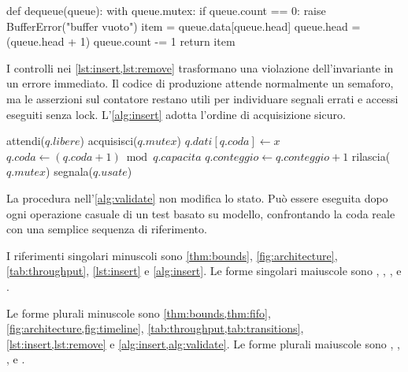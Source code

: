 \documentclass[italian]{../../unipd-notes}
\begin{document}
\begin{unipdcode}[language=Python,caption={Rimozione con controllo esplicito},label={lst:remove}]
def dequeue(queue):
    with queue.mutex:
        if queue.count == 0:
            raise BufferError("buffer vuoto")
        item = queue.data[queue.head]
        queue.head = (queue.head + 1) %
        queue.count -= 1
        return item
\end{unipdcode}

I controlli nei \cref{lst:insert,lst:remove} trasformano una violazione dell'invariante in un errore immediato. Il codice di produzione attende normalmente un semaforo, ma le asserzioni sul contatore restano utili per individuare segnali errati e accessi eseguiti senza lock. L'\cref{alg:insert} adotta l'ordine di acquisizione sicuro.

\begin{algorithm}[H]
  \caption{Inserimento bloccante}\label{alg:insert}
  attendi($q.libere$)\;
  acquisisci($q.mutex$)\;
  $q.dati[q.coda]\gets x$\;
  $q.coda\gets(q.coda+1)\bmod q.capacita$\;
  $q.conteggio\gets q.conteggio+1$\;
  rilascia($q.mutex$)\;
  segnala($q.usate$)\;
  \;
\end{algorithm}

La procedura nell'\cref{alg:validate} non modifica lo stato. Può essere eseguita dopo ogni operazione casuale di un test basato su modello, confrontando la coda reale con una semplice sequenza di riferimento.

\begin{algorithm}[H]
  \caption{Validazione dello stato della coda}\label{alg:validate}
  \;
\end{algorithm}

I riferimenti singolari minuscoli sono \cref{thm:bounds}, \cref{fig:architecture}, \cref{tab:throughput}, \cref{lst:insert} e \cref{alg:insert}. Le forme singolari maiuscole sono , , ,  e .

Le forme plurali minuscole sono \cref{thm:bounds,thm:fifo}, \cref{fig:architecture,fig:timeline}, \cref{tab:throughput,tab:transitions}, \cref{lst:insert,lst:remove} e \cref{alg:insert,alg:validate}. Le forme plurali maiuscole sono , , ,  e .
\end{document}
